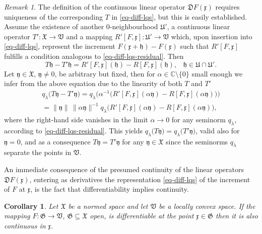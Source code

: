 \documentclass[11pt,twoside,openright]{report}
\theoremstyle{definition}
\theoremstyle{plain}
\newtheorem{Cor}[Def]{Corollary}
\theoremstyle{remark}
\newtheorem*{Rem}{Remark}
\theoremstyle{assumption}
\newcommand{\set}[1]{\{ #1 \}}
\newcommand{\norm}[1]{\lVert #1 \rVert}
\newcommand{\ql}{q_\lambda}
\newcommand{\bqlx}[1]{q_\lambda \bigl( #1 \bigr)}
\newcommand{\Cbb}{\mathbb{C}}
\newcommand{\zerofrak}{\mathfrak{0}}
\newcommand{\Dfrak}{\mathfrak{D}}
\newcommand{\Gfrak}{\mathfrak{G}}
\newcommand{\Ufrak}{\mathfrak{U}}
\newcommand{\Vfrak}{\mathfrak{V}}
\newcommand{\Xfrak}{\mathfrak{X}}
\newcommand{\hfrak}{\mathfrak{h}}
\newcommand{\xfrak}{\mathfrak{x}}
\newcommand{\yfrak}{\mathfrak{y}}
\begin{document}
\begin{Rem}
  The definition of the continuous linear operator $\Dfrak F ( \xfrak
  )$ requires uniqueness of the corresponding $T$ in
  \eqref{eq-diff-lqs}, but this is easily established. Assume the
  existence of another $\zerofrak$-neighbourhood $\Ufrak'$, a
  continuous linear operator $T' : \Xfrak \rightarrow \Vfrak$ and a
  mapping $R' [ F , \xfrak ] : \Ufrak' \rightarrow \Vfrak$ which, upon
  insertion into \eqref{eq-diff-lqs}, represent the increment $F (
  \xfrak + \hfrak ) -  F ( \xfrak )$ such that $R' [ F , \xfrak ]$
  fulfills a condition analogous to \eqref{eq-diff-lqs-residual}. Then
  \begin{equation*}
    T \hfrak - T' \hfrak = R' [ F , \xfrak ] ( \hfrak ) - R [ F ,
    \xfrak ] ( \hfrak ) \text{,} \quad \hfrak \in \Ufrak \cap \Ufrak'
    \text{.}
  \end{equation*}
  Let $\yfrak \in \Xfrak$, $\yfrak \not= \zerofrak$, be arbitrary but
  fixed, then for $\alpha \in \Cbb \setminus \set{0}$ small enough we
  infer from the above equation due to the linearity of both $T$ and
  $T'$
  \begin{multline*}
    \bqlx{T \yfrak - T' \yfrak} = \bqlx{\alpha^{-1} \bigl( R' [ F ,
    \xfrak ] ( \alpha \yfrak ) - R [ F , \xfrak ] ( \alpha \yfrak )
    \bigr)} \\
    = \norm{\yfrak} \, \norm{\alpha \yfrak}^{-1} \bqlx{R' [ F , \xfrak
    ] ( \alpha \yfrak ) - R [ F , \xfrak ] ( \alpha \yfrak )} \text{,}
  \end{multline*}
  where the right-hand side vanishes in the limit $\alpha \rightarrow
  0$ for any seminorm $\ql$, according to
  \eqref{eq-diff-lqs-residual}. This yields $\bqlx{T \yfrak} = 
  \bqlx{T' \yfrak}$, valid also for $\yfrak = \zerofrak$, and as a
  consequence $T \yfrak = T' \yfrak$ for any $\yfrak \in \Xfrak$ since
  the seminorms $\ql$ separate the points in $\Vfrak$.
\end{Rem}
An immediate consequence of the presumed continuity of the linear
operators $\Dfrak F ( \xfrak )$, entering as derivatives the
representation \eqref{eq-diff-lqs} of the increment of $F$ at
$\xfrak$, is the fact that differentiability implies continuity.
\begin{Cor}
  \label{Cor-diff-continuity}
  Let $\Xfrak$ be a normed space and let $\Vfrak$ be a locally convex
  space. If the mapping $F : \Gfrak \rightarrow \Vfrak$, $\Gfrak
  \subseteq \Xfrak$ open, is differentiable at the point $\xfrak \in
  \Gfrak$ then it is also continuous in $\xfrak$.
\end{Cor}
\end{document}
